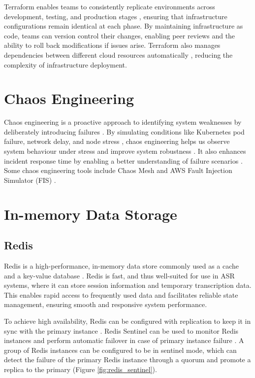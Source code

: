 Terraform enables teams to consistently replicate environments across development, testing, and production stages \cite{iac_benefits}, ensuring that infrastructure configurations remain identical at each phase. By maintaining infrastructure as code, teams can version control their changes, enabling peer reviews and the ability to roll back modifications if issues arise. Terraform also manages dependencies between different cloud resources automatically \cite{terraform_dependencies}, reducing the complexity of infrastructure deployment. 

\section{Chaos Engineering}
Chaos engineering is a proactive approach to identifying system weaknesses by deliberately introducing failures \cite{chaos_engineering_definition}. By simulating conditions like Kubernetes pod failure, network delay, and node stress \cite{chaos_mesh_feature}, chaos engineering helps us observe system behaviour under stress and improve system robustness \cite{chaos_engineering_definition}. It also enhances incident response time by enabling a better understanding of failure scenarios \cite{chaos_engineering_definition}. Some chaos engineering tools include Chaos Mesh \cite{chaos_mesh_introduction} and AWS Fault Injection Simulator (FIS) \cite{fis_introduction}.\enlargethispage{1\baselineskip}

\section{In-memory Data Storage}
\subsection{Redis}
Redis is a high-performance, in-memory data store commonly used as a cache and a key-value database \cite{redis_definition}. Redis is fast, and thus well-suited for use in ASR systems, where it can store session information and temporary transcription data. This enables rapid access to frequently used data and facilitates reliable state management, ensuring smooth and responsive system performance. 

To achieve high availability, Redis can be configured with replication to keep it in sync with the primary instance \cite{redis_replication}. Redis Sentinel can be used to monitor Redis instances and perform automatic failover in case of primary instance failure \cite{redis_sentinel}. A group of Redis instances can be configured to be in sentinel mode, which can detect the failure of the primary Redis instance through a quorum and promote a replica to the primary (Figure \ref{fig:redis_sentinel}).

